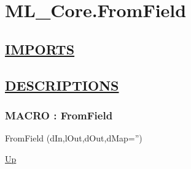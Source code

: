 \chapter*{ML\_Core.FromField}
\hypertarget{ecldoc:toc:ML_Core.FromField}{}

\section*{\underline{IMPORTS}}

\section*{\underline{DESCRIPTIONS}}
\subsection*{MACRO : FromField}
\hypertarget{ecldoc:ml_core.fromfield}{}
\begin{minipage}[t]{\textwidth}
\begin{flushleft}
 FromField (dIn,lOut,dOut,dMap='')
\end{flushleft}
\end{minipage}
\hyperlink{ecldoc:toc:ML_Core}{Up}

\par
\par
